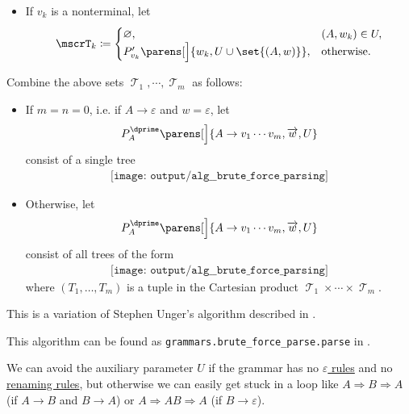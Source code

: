 \begin{algorithm}
\begin{thmenum}
\begin{itemize}
      \item If \( v_k \) is a nonterminal, let
      \begin{equation*}
        \mscrT_k \coloneqq \begin{cases}
          \varnothing,                                         &(A, w_k) \in U, \\
          P'_{v_k}\parens[\Big]{ w_k, U \cup \set{ (A, w) } }, &\T{otherwise.}
        \end{cases}
      \end{equation*}
    \end{itemize}

     Combine the above sets \( \mscrT_1, \cdots, \mscrT_m \) as follows:
    \begin{itemize}
      \item If \( m = n = 0 \), i.e. if \( A \to \varepsilon \) and \( w = \varepsilon \), let
      \begin{equation*}
        P^\dprime_A\parens[\Big]{ A \to v_1 \cdots v_m, \vect w, U }
      \end{equation*}
      consist of a single tree
      \begin{equation*}
        \begin{aligned}
          \texttt{[image: output/alg\_\_brute\_force\_parsing]}
        \end{aligned}
      \end{equation*}

      \item Otherwise, let
      \begin{equation*}
        P^\dprime_A\parens[\Big]{ A \to v_1 \cdots v_m, \vect w, U }
      \end{equation*}
      consist of all trees of the form
      \begin{equation*}
        \begin{aligned}
          \texttt{[image: output/alg\_\_brute\_force\_parsing]}
        \end{aligned}
      \end{equation*}
      where \( (T_1, \ldots, T_m) \) is a tuple in the Cartesian product \( \mscrT_1 \times \cdots \times \mscrT_m \).
    \end{itemize}
  \end{thmenum}
\end{algorithm}
\begin{comments}
  \item This is a variation of Stephen Unger's algorithm described in \cite{Unger1968}.
  \item This algorithm can be found as \texttt{grammars.brute\_force\_parse.parse} in \cite{code}.
  \item We can avoid the auxiliary parameter \( U \) if the grammar has no \hyperref[def:epsilon_free_grammar]{\( \varepsilon \) rules} and no \hyperref[def:renaming_rule]{renaming rules}, but otherwise we can easily get stuck in a loop like \( A \Rightarrow B \Rightarrow A \) (if \( A \to B \) and \( B \to A \)) or \( A \Rightarrow AB \Rightarrow A \) (if \( B \to \varepsilon \)).
\end{comments}

